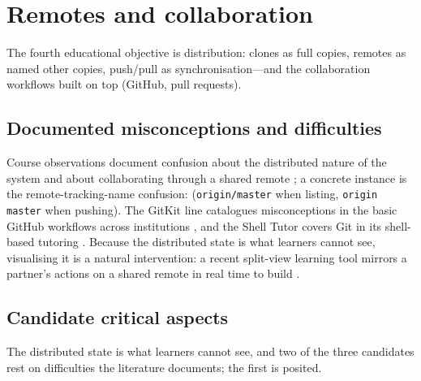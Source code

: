 \mode*
\section{Remotes and collaboration}
\label{sec:remotes}

The fourth educational objective is distribution: clones as full copies,
remotes as named other copies, push/pull as synchronisation---and the
collaboration workflows built on top (GitHub, pull requests).

\subsection{Documented misconceptions and difficulties}

Course observations document confusion about the distributed nature of the
system and about collaborating through a shared remote
\autocite{IsomottonenCochez2014}; a concrete instance is the
remote-tracking-name confusion:
(\texttt{origin/master} when listing, \texttt{origin master} when pushing).
The GitKit line catalogues misconceptions in the basic GitHub workflows
across institutions \autocite{Postner2026GitMisconceptions,Braught2024GitKit},
and the Shell Tutor covers Git in its shell-based tutoring
\autocite{Winder2024ShellTutor}.
Because the distributed state is what learners cannot see, visualising it is a
natural intervention: a recent split-view learning tool mirrors a partner's
actions on a shared remote in real time to build
.

\subsection{Candidate critical aspects}
\label{sec:remotes-aspects}

The distributed state is what learners cannot see, and two of the three
candidates rest on difficulties the literature documents; the first is
posited.


